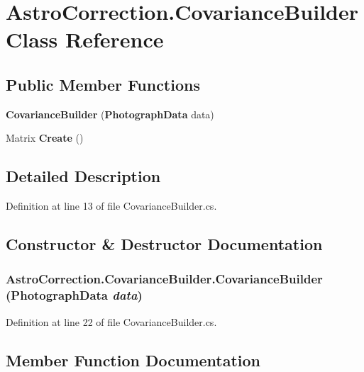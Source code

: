 \section{AstroCorrection.CovarianceBuilder Class Reference}
\label{class_astro_correction_1_1_covariance_builder}
\subsection*{Public Member Functions}
\begin{DoxyCompactItemize}
\item 
{\bf CovarianceBuilder} ({\bf PhotographData} data)
\item 
Matrix {\bf Create} ()
\end{DoxyCompactItemize}


\subsection{Detailed Description}


Definition at line 13 of file CovarianceBuilder.cs.

\subsection{Constructor \& Destructor Documentation}
\subsubsection[{CovarianceBuilder}]{\setlength{\rightskip}{0pt plus 5cm}AstroCorrection.CovarianceBuilder.CovarianceBuilder ({\bf PhotographData} {\em data})}\label{class_astro_correction_1_1_covariance_builder_a9fcc5d6904a014be52c960a1823a9457}


Definition at line 22 of file CovarianceBuilder.cs.

\subsection{Member Function Documentation}
